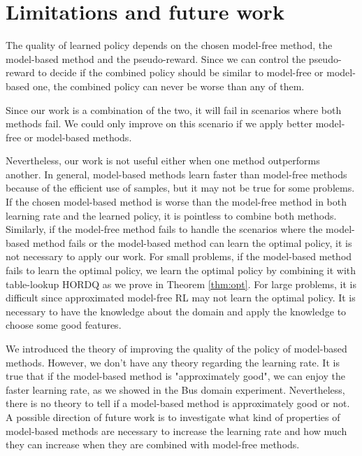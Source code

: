\section{Limitations and future work}

The quality of learned policy depends on the chosen model-free method,
the model-based method and the pseudo-reward. 
Since we can control the pseudo-reward to decide if the combined
policy should be similar to model-free or model-based one,
the combined policy can never be worse than any of them. 

Since our work is a combination of the two, it will fail in scenarios where both methods fail. 
We could only improve on this scenario if we apply better model-free or model-based methods. 


Nevertheless, our work is not useful either when one method outperforms another.
In general, model-based methods learn faster than model-free methods because of
the efficient use of samples, but it may not be true for some problems. 
If the chosen model-based method is worse than the model-free method in both learning
rate and the learned policy, it is pointless to combine both methods. 
Similarly, if the model-free method fails to handle the scenarios where the model-based
method fails or the model-based method can learn the optimal policy, it is not necessary to apply our work.
For small problems, if the model-based method fails to learn the optimal policy, 
we learn the optimal policy by combining it with table-lookup HORDQ as we prove in Theorem \ref{thm:opt}.
For large problems, it is difficult since approximated model-free RL may not learn the optimal policy.
It is necessary to have the knowledge about the domain and apply the knowledge to choose some good features.


We introduced the theory of improving the quality of the policy of model-based methods. However, we don't have any theory regarding the learning rate.
It is true that if the model-based method is "approximately good", we can enjoy the 
faster learning rate, as we showed in the Bus domain experiment. Nevertheless, there is no theory to tell if a model-based method is approximately good or not.
A possible direction of future work is to investigate what kind of properties of model-based
methods are necessary to increase the learning rate and how much they can increase when they are combined with model-free methods.

